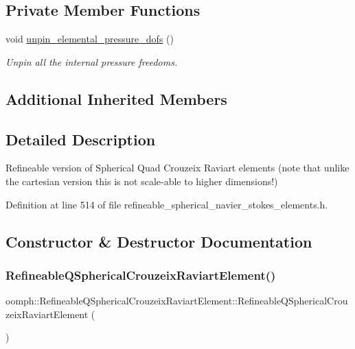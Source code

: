 \subsection*{Private Member Functions}
\begin{DoxyCompactItemize}
\item 
void \hyperlink{classoomph_1_1RefineableQSphericalCrouzeixRaviartElement_a6812b8e6bb7bbe56c75e60296512baa7}{unpin\+\_\+elemental\+\_\+pressure\+\_\+dofs} ()
\begin{DoxyCompactList}\small\item\em Unpin all the internal pressure freedoms. \end{DoxyCompactList}\end{DoxyCompactItemize}
\subsection*{Additional Inherited Members}


\subsection{Detailed Description}
Refineable version of Spherical Quad Crouzeix Raviart elements (note that unlike the cartesian version this is not scale-\/able to higher dimensions!) 

Definition at line 514 of file refineable\+\_\+spherical\+\_\+navier\+\_\+stokes\+\_\+elements.\+h.



\subsection{Constructor \& Destructor Documentation}
\mbox{\label{classoomph_1_1RefineableQSphericalCrouzeixRaviartElement_a410be200f53a4a5e5d18c9e09a58d78d}} 
\subsubsection{\texorpdfstring{Refineable\+Q\+Spherical\+Crouzeix\+Raviart\+Element()}{RefineableQSphericalCrouzeixRaviartElement()}}
{\footnotesize\ttfamily oomph\+::\+Refineable\+Q\+Spherical\+Crouzeix\+Raviart\+Element\+::\+Refineable\+Q\+Spherical\+Crouzeix\+Raviart\+Element (\begin{DoxyParamCaption}{ }\end{DoxyParamCaption})\hspace{0.3cm}{\ttfamily [inline]}}



